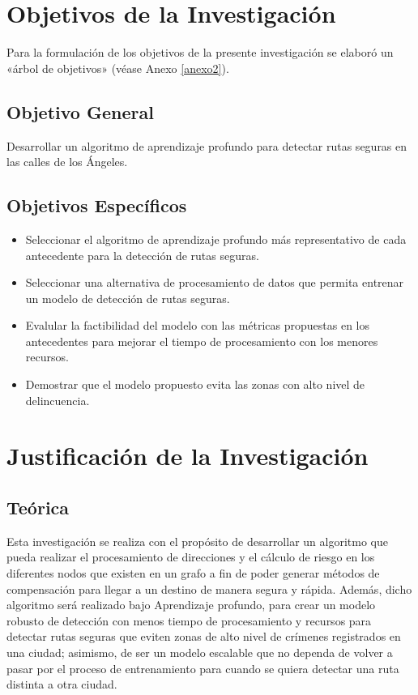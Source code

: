 \section{Objetivos de la Investigación}
Para la formulación de los objetivos de la presente investigación se elaboró un «árbol de objetivos» (véase Anexo \ref{anexo2}).
\subsection{Objetivo General}
\newcommand{\ObjetivoGeneral}{
Desarrollar un algoritmo de aprendizaje profundo para detectar rutas seguras en las calles de los Ángeles.
}
\ObjetivoGeneral
\subsection{Objetivos Espec\'{i}ficos}
\newcommand{\Objone}{
Seleccionar el algoritmo de aprendizaje profundo más representativo de cada antecedente para la detección de rutas seguras.
}
\newcommand{\Objtwo}{
Seleccionar una alternativa de procesamiento de datos que permita entrenar un modelo de detección de rutas seguras.
}
\newcommand{\Objthree}{
Evalular la factibilidad del modelo con las métricas propuestas en los antecedentes para mejorar el tiempo de procesamiento con los menores recursos.
}
\newcommand{\Objfour}{
Demostrar que el modelo propuesto evita las zonas con alto nivel de delincuencia.
}

\begin{itemize}
	\item {\Objone}
	\item {\Objtwo}
	\item {\Objthree}
	\item {\Objfour}
\end{itemize}

\section{Justificación de la Investigación}

\subsection{Teórica}
Esta investigación se realiza con el propósito de desarrollar un algoritmo que pueda realizar el procesamiento de direcciones y el cálculo de riesgo en los diferentes nodos que existen en un grafo a fin de poder generar métodos de compensación para llegar a un destino de manera segura y rápida. Además, dicho algoritmo será realizado bajo Aprendizaje profundo, para crear un modelo robusto de detección con menos tiempo de procesamiento y recursos para detectar rutas seguras que eviten zonas de alto nivel de crímenes registrados en una ciudad; asimismo, de ser un modelo escalable que no dependa de volver a pasar por el proceso de entrenamiento para cuando se quiera detectar una ruta distinta a otra ciudad.

